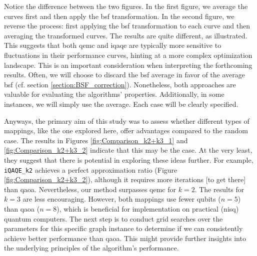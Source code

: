 Notice the difference between the two figures. In the first figure, we average the curves first and then apply the \acrshort{bsf} transformation. In the second figure, we reverse the process: first applying the \acrshort{bsf} transformation to each curve and then averaging the transformed curves. The results are quite different, as illustrated. This suggests that both \acrshort{qemc} and \acrshort{iqaqe} are typically more sensitive to fluctuations in their performance curves, hinting at a more complex optimization landscape. This is an important consideration when interpreting the forthcoming results. Often, we will choose to discard the \acrshort{bsf} average in favor of the average \acrshort{bsf} (cf. section \ref{section:BSF_correction}). Nonetheless, both approaches are valuable for evaluating the algorithms' properties. Additionally, in some instances, we will simply use the average. Each case will be clearly specified.


Anyways, the primary aim of this study was to assess whether different types of mappings, like the one explored here, offer advantages compared to the random case. The results in Figures \ref{fig:Comparison_k2+k3_1} and \ref{fig:Comparison_k2+k3_2} indicate that this may be the case. At the very least, they suggest that there is potential in exploring these ideas further. For example, \texttt{iQAQE\_k2} achieves a perfect approximation ratio (Figure \ref{fig:Comparison_k2+k3_2}), although it requires more iterations [to get there] than \acrshort{qaoa}. Nevertheless, our method surpasses \acrshort{qemc} for $k = 2$. The results for $k = 3$ are less encouraging. However, both mappings use fewer qubits ($n = 5$) than \acrshort{qaoa} ($n = 8$), which is beneficial for implementation on practical (\acrshort{nisq}) quantum computers. The next step is to conduct grid searches over the parameters for this specific graph instance to determine if we can consistently achieve better performance than \acrshort{qaoa}. This might provide further insights into the underlying principles of the algorithm's performance.

